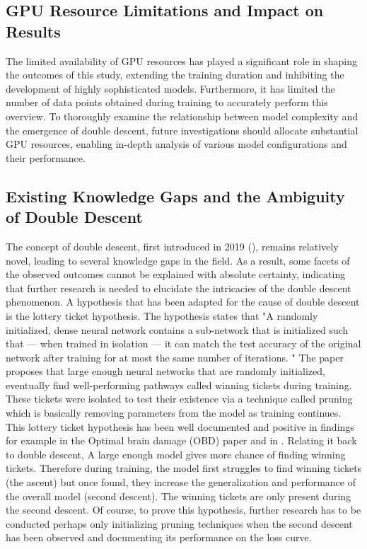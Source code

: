 \subsection{GPU Resource Limitations and Impact on Results}
The limited availability of GPU resources has played a significant role in shaping the outcomes of this study, extending the training duration and inhibiting the development of highly sophisticated models. Furthermore, it has limited the number of data points obtained during training to accurately perform this overview. To thoroughly examine the relationship between model complexity and the emergence of double descent, future investigations should allocate substantial GPU resources, enabling in-depth analysis of various model configurations and their performance.

\subsection{Existing Knowledge Gaps and the Ambiguity of Double Descent}
The concept of double descent, first introduced in 2019 (\cite{Belkin2019ReconcilingTrade-off}), remains relatively novel, leading to several knowledge gaps in the field. As a result, some facets of the observed outcomes cannot be explained with absolute certainty, indicating that further research is needed to elucidate the intricacies of the double descent phenomenon. A hypothesis that has been adapted for the cause of double descent is the lottery ticket hypothesis. The hypothesis states that "A randomly initialized, dense neural network contains a sub-network that is initialized such that — when trained in isolation — it can match the test accuracy of the original network after training for at most the same number of iterations. \cite{Frankle2018TheNetworks}" The paper proposes that large enough neural networks that are randomly initialized, eventually find well-performing pathways called winning tickets during training. These tickets were isolated to test their existence via a technique called pruning which is basically removing parameters from the model as training continues. This lottery ticket hypothesis has been well documented and positive in findings for example in the Optimal brain damage (OBD) paper \cite{Denker2014OptimalDamage} and in \cite{Frankle2018TheNetworks}. Relating it back to double descent, A large enough model gives more chance of finding winning tickets. Therefore during training, the model first struggles to find winning tickets (the ascent) but once found, they increase the generalization and performance of the overall model (second descent). The winning tickets are only present during the second descent. Of course, to prove this hypothesis, further research has to be conducted perhaps only initializing pruning techniques when the second descent has been observed and documenting its performance on the loss curve.

